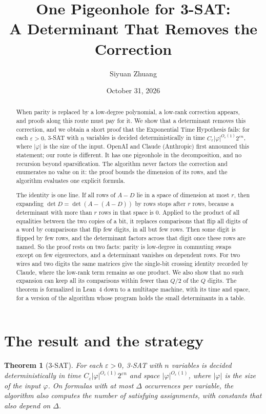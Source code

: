 \documentclass[11pt]{article}
\title{One Pigeonhole for 3-SAT:\\A Determinant That Removes the Correction}
\author{Siyuan Zhuang}
\date{October 31, 2026}
\numberwithin{equation}{section}
\newtheorem{theorem}{Theorem}[section]
\theoremstyle{remark}
\begin{document}
\maketitle

\begin{abstract}
When parity is replaced by a low-degree polynomial, a low-rank correction appears, and proofs along this route must pay for it. We show that a determinant removes this correction, and we obtain a short proof that the Exponential Time Hypothesis fails: for each $\varepsilon>0$, 3-SAT with $n$ variables is decided deterministically in time $C_\varepsilon|\varphi|^{O_\varepsilon(1)}2^{\varepsilon n}$, where $|\varphi|$ is the size of the input. OpenAI and Claude (Anthropic) first announced this statement; our route is different. It has one pigeonhole in the decomposition, and no recursion beyond sparsification. The algorithm never factors the correction and enumerates no value on it: the proof bounds the dimension of its rows, and the algorithm evaluates one explicit formula.

The identity is one line. If all rows of $A-D$ lie in a space of dimension at most $r$, then expanding $\det D=\det(A-(A-D))$ by rows stops after $r$ rows, because a determinant with more than $r$ rows in that space is $0$. Applied to the product of all equalities between the two copies of a bit, it replaces comparisons that flip all digits of a word by comparisons that flip few digits, in all but few rows. Then some digit is flipped by few rows, and the determinant factors across that digit once these rows are named. So the proof rests on two facts: parity is low-degree in commuting swaps except on few eigenvectors, and a determinant vanishes on dependent rows. For two wires and two digits the same matrices give the single-bit crossing identity recorded by Claude, where the low-rank term remains as one product. We also show that no such expansion can keep all its comparisons within fewer than $Q/2$ of the $Q$ digits. The theorem is formalized in Lean~4 down to a multitape machine, with its time and space, for a version of the algorithm whose program holds the small determinants in a table.
\end{abstract}

\section{The result and the strategy}\label{sec:overview}

\begin{theorem}[3-SAT]\label{thm:sat}
For each $\varepsilon>0$, 3-SAT with $n$ variables is decided deterministically in time $C_\varepsilon|\varphi|^{O_\varepsilon(1)}2^{\varepsilon n}$ and space $|\varphi|^{O_\varepsilon(1)}$, where $|\varphi|$ is the size of the input $\varphi$. On formulas with at most $\Delta$ occurrences per variable, the algorithm also computes the number of satisfying assignments, with constants that also depend on $\Delta$.
\end{theorem}
\end{document}
